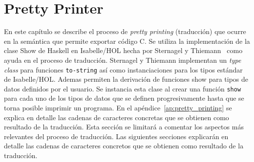 \chapter{Pretty Printer}\label{chapter:pretty}

En este capítulo se describe el proceso de \textit{pretty printing} (traducción) que ocurre en la semántica que permite exportar código C.
Se utiliza la implementación de la clase Show de Haskell en Isabelle/HOL hecha por Sternagel y Thiemann~\citeyearpar{Show-AFP} como ayuda en el proceso de traducción.
Sternagel y Thiemann implementan un \textit{type class} para funciones \verb|to-string| así como instanciaciones para los tipos estándar de Isabelle/HOL.
Ademas permiten la derivación de funciones show para tipos de datos definidos por el usuario.
Se instancia esta clase al crear una función \verb|show| para cada uno de los tipos de datos que se definen progresivamente hasta que se torna posible imprimir un programa.
En el apéndice~\ref{ap:pretty_printing} se explica en detalle las cadenas de caracteres concretas que se obtienen como resultado de la traducción.
Esta sección se limitará a comentar los aspectos más relevantes del proceso de traducción.
Las siguientes secciones explicarán en detalle las cadenas de caracteres concretos que se obtienen como resultado de la traducción.

